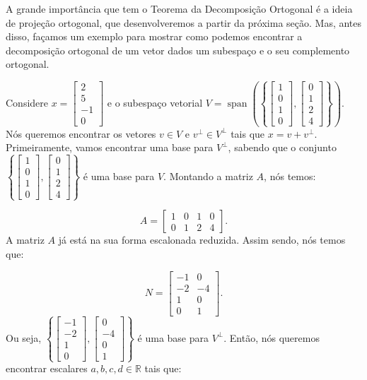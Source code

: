 A grande importância que tem o Teorema da Decomposição Ortogonal é a ideia de projeção ortogonal, que desenvolveremos a partir da próxima seção. Mas, antes disso, façamos um exemplo para mostrar como podemos encontrar a decomposição ortogonal de um vetor dados um subespaço e o seu complemento ortogonal.

\begin{Example}
	Considere $x = \begin{bmatrix}
		2 \\
		5 \\
		-1 \\
		0
	\end{bmatrix}$ e o subespaço vetorial $V = \operatorname{span}\left(\left\{\begin{bmatrix}
		1 \\
		0 \\
		1 \\
		0
	\end{bmatrix}, \begin{bmatrix}
		0 \\
		1 \\
		2 \\
		4
	\end{bmatrix}\right\}\right)$. Nós queremos encontrar os vetores $v\in V$ e $v^\perp\in V^\perp$ tais que $x = v + v^\perp$. Primeiramente, vamos encontrar uma base para $V^\perp$, sabendo que o conjunto $\left\{\begin{bmatrix}
		1 \\
		0 \\
		1 \\
		0
	\end{bmatrix}, \begin{bmatrix}
		0 \\
		1 \\
		2 \\
		4
	\end{bmatrix}\right\}$ é uma base para $V$. Montando a matriz $A$, nós temos:
	
	$$
	A = \begin{bmatrix}
		1 & 0 & 1 & 0 \\
		0 & 1 & 2 & 4
	\end{bmatrix}.
	$$
	A matriz $A$ já está na sua forma escalonada reduzida. Assim sendo, nós temos que:
	
	$$
	N = \begin{bmatrix}
		-1 & 0 \\
		-2 & -4 \\
		1 & 0 \\
		0 & 1
	\end{bmatrix}.
	$$
	Ou seja, $\left\{\begin{bmatrix}
		-1 \\
		-2 \\
		1 \\
		0
	\end{bmatrix}, \begin{bmatrix}
		0 \\
		-4 \\
		0 \\
		1
	\end{bmatrix}\right\}$ é uma base para $V^\perp$. Então, nós queremos encontrar escalares $a, b, c, d\in\mathbb{R}$ tais que:
	

\end{Example}
